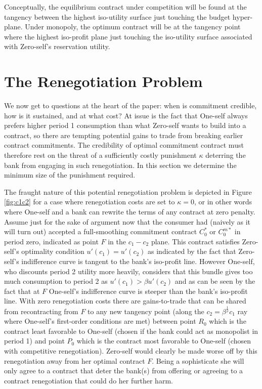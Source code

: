 \documentclass[11pt,english]{article}
\theoremstyle{plain}
\theoremstyle{definition}
\begin{document}
Conceptually,  the equilibrium contract under competition will be found
at the tangency between the highest iso-utility surface just touching
the budget hyper-plane. Under monopoly, the optimum contract will
be at the tangency point where the highest iso-profit plane just touching the iso-utility surface associated with Zero-self's reservation
utility.

\section{The Renegotiation Problem}\label{renegotiation}

We now get to questions at the heart of the paper: when is commitment
credible, how is it sustained, and at what cost? At issue is the fact
that One-self always prefers higher period 1 consumption than what Zero-self
wants to build into a contract, so there are tempting potential
gains to trade from breaking earlier contract commitments. The credibility
of optimal commitment contract must therefore rest on the threat
of a sufficiently costly punishment $\kappa$ deterring the bank from engaging
in such renegotiation. In this section we determine the minimum size
of the punishment required.

The fraught nature of this potential renegotiation problem
is depicted in Figure \ref{fig:c1c2} for a case where renegotiation
costs are set to $\kappa=0$, or in other words where One-self and a bank
can rewrite the terms of any contract at zero penalty. Assume \textendash{}
just for the sake of argument now \textendash{} that the consumer
had (naively as it will turn out) accepted a full-smoothing commitment
contract $C_{0}^{*}$ or $C_{0}^{m*}$ in period zero, indicated as
point $F$ in the \(c_{1}-c_2\) plane. This contract satisfies Zero-self's optimality
condition $u'(c_{1})=u'(c_{2})$ as indicated by the fact that Zero-self's
indifference curve is tangent to the bank's iso-profit line. However One-self, who discounts period 2 utility more heavily, considers that this bundle gives too much consumption to period 2  as $u'(c_{1})>\beta u'(c_{2})$ and as can
be seen by the fact that at $F$ One-self's indifference curve is
steeper than the bank's iso-profit line. With zero renegotiation costs
there are gains-to-trade that can be shared from recontracting from
$F$ to any new tangency point (along the $c_{2}=\beta^{\frac{1}{\rho}}c_{1}$
ray where One-self's first-order conditions are met) between point
$R_{0}$ which is the contract least favorable to One-self (chosen if
the bank could act as monopolist in period 1) and point $P_{0}$ which
is the contract most favorable to One-self (chosen with competitive
renegotiation). Zero-self would clearly be made  worse off by this  renegotiation
away from her optimal contract $F$. Being a sophisticate she will only agree to a contract that deter the bank(s) from offering or agreeing to a contract renegotiation that could do her further harm.     
\end{document}
